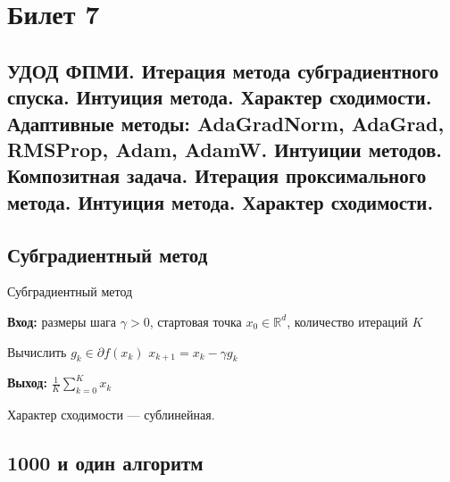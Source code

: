 \section{Билет 7}

\subsection{УДОД ФПМИ. Итерация метода субградиентного спуска. Интуиция метода. Характер
    сходимости. Адаптивные методы: AdaGradNorm, AdaGrad, RMSProp, Adam,
    AdamW. Интуиции методов. Композитная задача. Итерация проксимального метода. Интуиция метода. Характер сходимости.}

\subsection*{Субградиентный метод}

\begin{algorithm}[ht]
    \caption{Субградиентный метод}
    \textbf{Вход:} размеры шага $\gamma > 0$, стартовая точка $x_0 \in \mathbb{R}^d$, количество итераций $K$
    \begin{algorithmic}[1]
        \State Вычислить $g_k \in \partial f(x_k)$
        \State $x_{k+1} = x_k - \gamma g_k$
        \EndFor
    \end{algorithmic}
    \textbf{Выход:} $\frac{1}{K} \sum_{k=0}^{K} x_k$
\end{algorithm}

Характер сходимости --- сублинейная.

\subsection*{1000 и один алгоритм}

